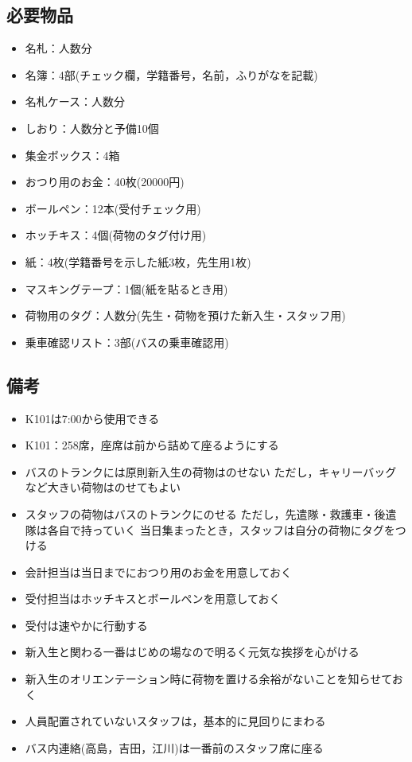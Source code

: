 


\subsection{必要物品}
\begin{itemize}
\item 名札：人数分
\item 名簿：4部(チェック欄，学籍番号，名前，ふりがなを記載)
\item 名札ケース：人数分
\item しおり：人数分と予備10個
\item 集金ボックス：4箱
\item おつり用のお金：40枚(20000円)
\item ボールペン：12本(受付チェック用)
\item ホッチキス：4個(荷物のタグ付け用)
\item 紙：4枚(学籍番号を示した紙3枚，先生用1枚)
\item マスキングテープ：1個(紙を貼るとき用)
\item 荷物用のタグ：人数分(先生・荷物を預けた新入生・スタッフ用)
\item 乗車確認リスト：3部(バスの乗車確認用)
\end{itemize}

\newpage

\subsection{備考}
\begin{itemize}
\item K101は7:00から使用できる
\item K101：258席，座席は前から詰めて座るようにする
\item バスのトランクには原則新入生の荷物はのせない ただし，キャリーバッグなど大きい荷物はのせてもよい
\item スタッフの荷物はバスのトランクにのせる ただし，先遣隊・救護車・後遣隊は各自で持っていく 当日集まったとき，スタッフは自分の荷物にタグをつける
\item 会計担当は当日までにおつり用のお金を用意しておく
\item 受付担当はホッチキスとボールペンを用意しておく
\item 受付は速やかに行動する
\item 新入生と関わる一番はじめの場なので明るく元気な挨拶を心がける
\item 新入生のオリエンテーション時に荷物を置ける余裕がないことを知らせておく
\item 人員配置されていないスタッフは，基本的に見回りにまわる
\item バス内連絡(高島，吉田，江川)は一番前のスタッフ席に座る 
\end{itemize}



